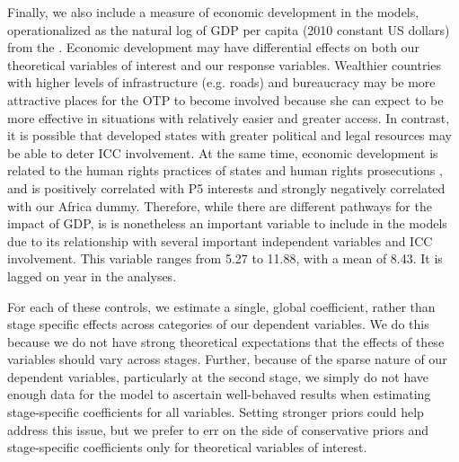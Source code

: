 Finally, we also include a measure of economic development in the models, operationalized as the natural log of GDP per capita (2010 constant US dollars) from the \citet{world2018world}.  Economic development may have differential effects on both our theoretical variables of interest and our response variables. Wealthier countries with higher levels of infrastructure (e.g. roads) and bureaucracy may be more attractive places for the OTP to become involved because she can expect to be more effective in situations with relatively easier and greater access. In contrast, it is possible that developed states with greater political and legal resources may be able to deter ICC involvement. At the same time, economic development is related to the human rights practices of states \citep{hill:jones:2014} and human rights prosecutions \cite{kim2012structural}, and is positively correlated with P5 interests and strongly negatively correlated with our Africa dummy. Therefore, while there are different pathways for the impact of GDP, is is nonetheless an important variable to include in the models due to its relationship with several important independent variables and ICC involvement. This variable ranges from 5.27 to 11.88, with a mean of 8.43. It is lagged on year in the analyses.

For each of these controls, we estimate a single, global coefficient, rather than stage specific effects across categories of our dependent variables. We do this because we do not have strong theoretical expectations that the effects of these variables should vary across stages. Further, because of the sparse nature of our dependent variables, particularly at the second stage, we simply do not have enough data for the model to ascertain well-behaved results when estimating stage-specific coefficients for all variables. Setting stronger priors could help address this issue, but we prefer to err on the side of conservative priors and stage-specific coefficients only for theoretical variables of interest.

